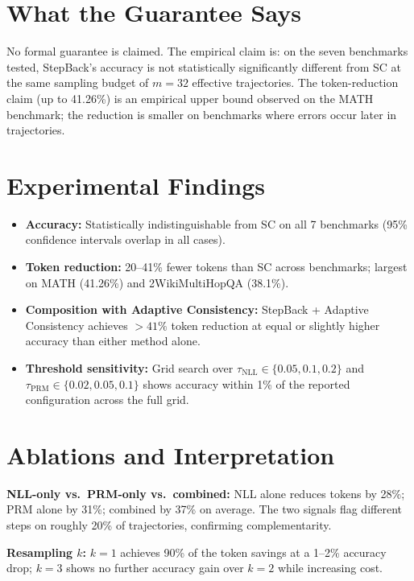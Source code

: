 \documentclass[10pt,twocolumn]{article}
\begin{document}
\section{What the Guarantee Says}

No formal guarantee is claimed. The empirical claim is: on the seven
benchmarks tested, StepBack's accuracy is not statistically significantly
different from SC at the same sampling budget of $m = 32$ effective
trajectories. The token-reduction claim (up to 41.26\%) is an empirical
upper bound observed on the MATH benchmark; the reduction is smaller on
benchmarks where errors occur later in trajectories.

\section{Experimental Findings}

\begin{itemize}[itemsep=2pt,parsep=0pt]
  \item \textbf{Accuracy:} Statistically indistinguishable from SC on
    all 7 benchmarks (95\% confidence intervals overlap in all cases).
  \item \textbf{Token reduction:} 20--41\% fewer tokens than SC across
    benchmarks; largest on MATH (41.26\%) and 2WikiMultiHopQA (38.1\%).
  \item \textbf{Composition with Adaptive Consistency:} StepBack +
    Adaptive Consistency achieves $>41\%$ token reduction at equal or
    slightly higher accuracy than either method alone.
  \item \textbf{Threshold sensitivity:} Grid search over
    $\tau_{\text{NLL}} \in \{0.05, 0.1, 0.2\}$ and
    $\tau_{\text{PRM}} \in \{0.02, 0.05, 0.1\}$ shows accuracy within
    1\% of the reported configuration across the full grid.
\end{itemize}

\section{Ablations and Interpretation}

\textbf{NLL-only vs.\ PRM-only vs.\ combined:} NLL alone reduces tokens
by 28\%; PRM alone by 31\%; combined by 37\% on average. The two
signals flag different steps on roughly 20\% of trajectories,
confirming complementarity.

\textbf{Resampling $k$:} $k = 1$ achieves 90\% of the token savings
at a 1--2\% accuracy drop; $k = 3$ shows no further accuracy gain over
$k = 2$ while increasing cost.
\end{document}
